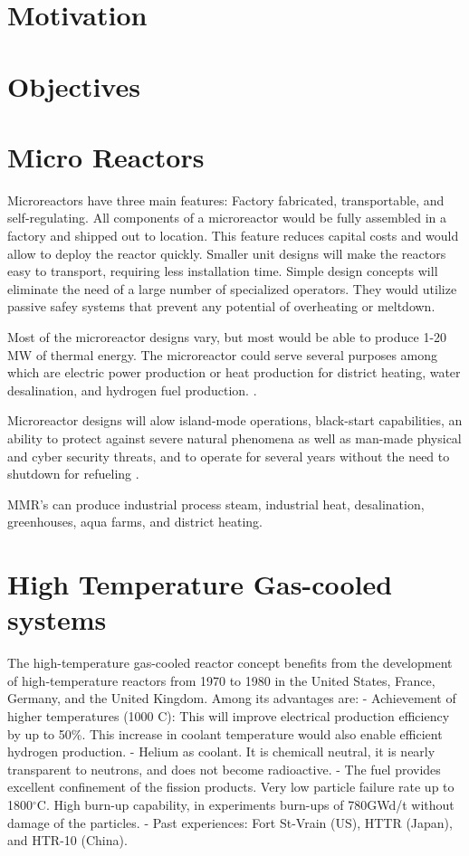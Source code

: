 \section{Motivation}



\section{Objectives}



\section{Micro Reactors}

Microreactors have three main features: Factory fabricated, transportable, and self-regulating. All components of a microreactor would be fully assembled in a factory and shipped out to location. This feature reduces capital costs and would allow to deploy the reactor quickly. Smaller unit designs will make the reactors easy to transport, requiring less installation time. Simple design concepts will eliminate the need of a large number of specialized operators. They would utilize passive safey systems that prevent any potential of overheating or meltdown.

Most of the microreactor designs vary, but most would be able to produce 1-20 MW of thermal energy. The microreactor could serve several purposes among which are electric power production or heat production for district heating, water desalination, and hydrogen fuel production.
\cite{noauthor_ultimate_2019}.

Microreactor designs will alow island-mode operations, black-start capabilities, an ability to protect against severe natural phenomena as well as man-made physical and cyber security threats, and to operate for several years without the need to shutdown for refueling \cite{nichol_roadmap_2018}.

MMR's can produce industrial process steam, industrial heat, desalination, greenhouses, aqua farms, and district heating.

\section{High Temperature Gas-cooled systems}

The high-temperature gas-cooled reactor concept benefits from the development of high-temperature reactors from 1970 to 1980 in the United States, France, Germany, and the United Kingdom. 
Among its advantages are:
- Achievement of higher temperatures (1000 C): This will improve electrical production efficiency by up to 50\%. This increase in coolant temperature would also enable efficient hydrogen production.
- Helium as coolant. It is chemicall neutral, it is nearly transparent to neutrons, and does not become radioactive.
- The fuel provides excellent confinement of the fission products. Very low particle failure rate up to 1800$^{\circ}$C. High burn-up capability, in experiments burn-ups of 780GWd/t without damage of the particles.
- Past experiences: Fort St-Vrain (US), HTTR (Japan), and HTR-10 (China).
\cite{france_gas-cooled_2006}

